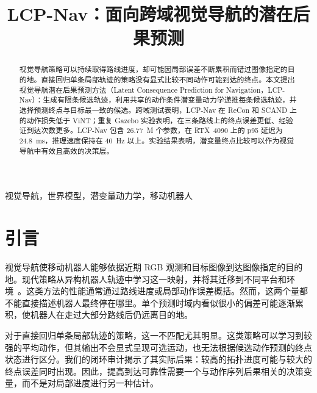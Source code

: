 \documentclass[conference]{IEEEtran}
\begin{document}
\title{LCP-Nav：面向跨域视觉导航的潜在后果预测}

\author{
}

\maketitle

\begin{abstract}
视觉导航策略可以持续取得路线进度，却可能因局部误差不断累积而错过图像指定的目的地。直接回归单条局部轨迹的策略没有显式比较不同动作可能到达的终点。本文提出视觉导航潜在后果预测方法（Latent Consequence Prediction for Navigation，LCP-Nav）：生成有限条候选轨迹，利用共享的动作条件潜变量动力学递推每条候选轨迹，并选择预测终点与目标最一致的候选。跨域测试表明，LCP-Nav 在 ReCon 和 SCAND 上的动作损失低于 ViNT；重复 Gazebo 实验表明，在三条路线上的终点误差更低、经验证到达次数更多。LCP-Nav 包含 $26.77$~M 个参数，在 RTX~4090 上的 p95 延迟为 $24.8$~ms，推理速度保持在 $40$~Hz 以上。实验结果表明，潜变量终点比较可以作为视觉导航中有效且高效的决策层。
\end{abstract}

\begin{IEEEkeywords}
视觉导航，世界模型，潜变量动力学，移动机器人
\end{IEEEkeywords}

\section{引言}

视觉导航使移动机器人能够依据近期 RGB 观测和目标图像到达图像指定的目的地。现代策略从异构机器人轨迹中学习这一映射，并将其迁移到不同平台和环境~\cite{gnm,vint}。这类方法的性能通常通过路线进度或局部动作误差概括。然而，这两个量都不能直接描述机器人最终停在哪里。单个预测时域内看似很小的偏差可能逐渐累积，使机器人在走过大部分路线后仍远离目的地。

对于直接回归单条局部轨迹的策略，这一不匹配尤其明显。这类策略可以学习到较强的平均动作，但其输出不会显式呈现可选运动，也无法根据候选动作预测的终点状态进行区分。我们的闭环审计揭示了其实际后果：较高的拓扑进度可能与较大的终点误差同时出现。因此，提高到达可靠性需要一个与动作序列后果相关的决策变量，而不是对局部进度进行另一种估计。
\end{document}
